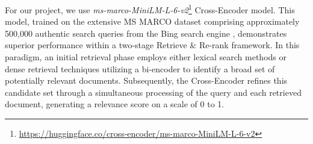 \begin{table}[ht!]
    \centering
    \noindent
    \caption{Performance of Pre-trained Cross-Encoders}
    \label{tab:table2}
\end{table}

For our project, we use \textit{ms-marco-MiniLM-L-6-v2}\footnote{\url{https://huggingface.co/cross-encoder/ms-marco-MiniLM-L-6-v2}} Cross-Encoder model.
This model, trained on the extensive MS MARCO dataset comprising approximately 500,000 authentic search queries from the Bing search engine \cite{reimers-2019-sentence-bert}, demonstrates superior performance within a two-stage Retrieve \& Re-rank framework.
In this paradigm, an initial retrieval phase employs either lexical search methods or dense retrieval techniques utilizing a bi-encoder to identify a broad set of potentially relevant documents.
Subsequently, the Cross-Encoder refines this candidate set through a simultaneous processing of the query and each retrieved document, generating a relevance score on a scale of 0 to 1.

